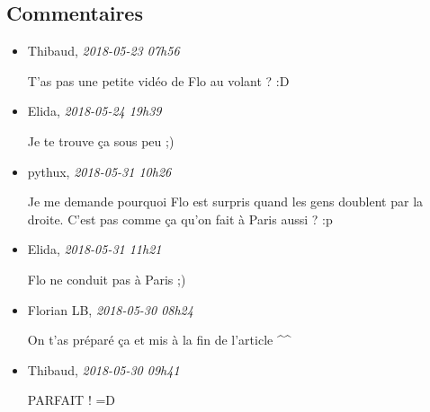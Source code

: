 \hypertarget{commentaires}{%
\subsection{Commentaires}\label{commentaires}}

\begin{itemize}
\item
  Thibaud, \emph{2018-05-23 07h56}

  T'as pas une petite vidéo de Flo au volant ? :D
\item
  Elida, \emph{2018-05-24 19h39}

  Je te trouve ça sous peu ;)
\item
  pythux, \emph{2018-05-31 10h26}

  Je me demande pourquoi Flo est surpris quand les gens doublent par la
  droite. C'est pas comme ça qu'on fait à Paris aussi ? :p
\item
  Elida, \emph{2018-05-31 11h21}

  Flo ne conduit pas à Paris ;)
\item
  Florian LB, \emph{2018-05-30 08h24}

  On t'as préparé ça et mis à la fin de l'article \^{}\^{}
\item
  Thibaud, \emph{2018-05-30 09h41}

  PARFAIT ! =D
\end{itemize}
